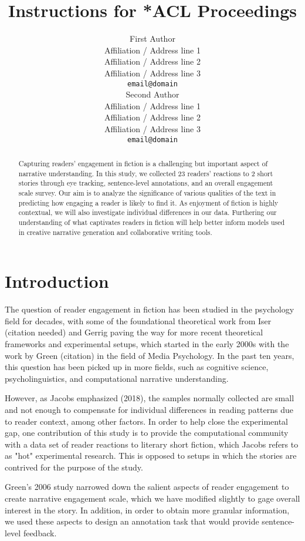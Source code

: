 \documentclass[11pt]{article}
\title{Instructions for *ACL Proceedings}
\author{First Author \\
  Affiliation / Address line 1 \\
  Affiliation / Address line 2 \\
  Affiliation / Address line 3 \\
  \texttt{email@domain} \\\And
  Second Author \\
  Affiliation / Address line 1 \\
  Affiliation / Address line 2 \\
  Affiliation / Address line 3 \\
  \texttt{email@domain} \\}
\begin{document}
\maketitle
\begin{abstract}
Capturing readers' engagement in fiction is a challenging but important aspect of narrative understanding. In this study, we collected 23 readers’ reactions to 2 short stories through eye tracking, sentence-level annotations, and an overall engagement scale survey. Our aim is to analyze the significance of various qualities of the text in predicting how engaging a reader is likely to find it. As enjoyment of fiction is highly contextual, we will also investigate individual differences in our data. Furthering our understanding of what captivates readers in fiction will help better inform models used in creative narrative generation and collaborative writing tools.

\end{abstract}

\section{Introduction}

The question of reader engagement in fiction has been studied in the psychology field for decades, with some of the foundational theoretical work from Iser (citation needed) and Gerrig paving the way for more recent theoretical frameworks and experimental setups, which started in the early 2000s with the work by Green (citation) in the field of Media Psychology. In the past ten years, this question has been picked up in more fields, such as cognitive science, psycholinguistics, and computational narrative understanding.

However, as Jacobs emphasized (2018), the samples normally collected are small and not enough to compensate for individual differences in reading patterns due to reader context, among other factors. In order to help close the experimental gap, one contribution of this study is to provide the computational community with a data set of reader reactions to literary short fiction, which Jacobs refers to as "hot" experimental research. This is opposed to setups in which the stories are contrived for the purpose of the study.

Green's 2006 study narrowed down the salient aspects of reader engagement to create narrative engagement scale, which we have modified slightly to gage overall interest in the story. In addition, in order to obtain more granular information, we used these aspects to design an annotation task that would provide sentence-level feedback.
\end{document}
